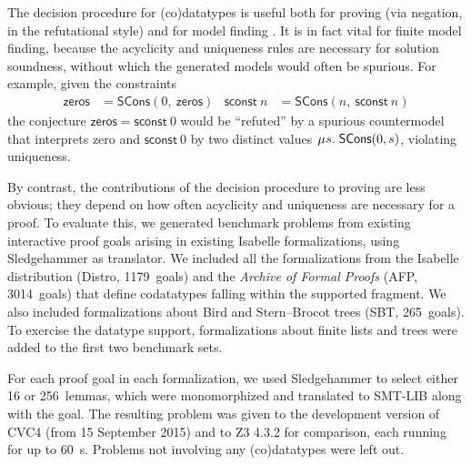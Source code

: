 \documentclass[letter]{article}
\newcommand\MU{\vvthinspace\mu\vvthinspace}
\theoremstyle{definition}
\newcommand\const[1]{\textsf{#1}}
\newcommand\vvthinspace{\kern+0.041667em}
\begin{document}
\newcommand\gandl{SBT}
\newcommand\HD[1]{\hbox to2em{\relax\hfill\!\!\!\!#1\!\!\!\!\hfill}}

The decision procedure for (co)datatypes is useful both for proving (via
negation, in the refutational style) and for model finding
\cite{ge-de-moura-2009,reynolds-et-al-2013}.
It is in fact vital for finite model finding,
because the acyclicity and uniqueness rules are necessary for solution
soundness, without which the generated models would often be
spurious. For example, given the constraints
\begin{align*}
\const{zeros} & = \const{SCons}(0,\:\const{zeros})
& \const{sconst}~n & = \const{SCons}(n,\:\const{sconst}~n)
\end{align*}
the conjecture
$\const{zeros} = \const{sconst}~0$
would be ``refuted'' by a spurious countermodel that interprets
\const{zero} and $\const{sconst}~0$ by two distinct
values $\MU s.\; \const{SCons}(0, s)$,
violating uniqueness.

By contrast, the contributions of the decision procedure
to proving are less obvious; they depend on how
often acyclicity and uniqueness are necessary for a proof.
To evaluate this,
we generated benchmark problems from existing interactive
proof goals arising in existing
Isabelle formalizations, using Sledgehammer \cite{blanchette-et-al-2013-smt}
as translator.
We
included all the formalizations from the Isabelle distribution (Distro, 1179~goals)
and the \emph{Archive of Formal Proofs} (AFP, 3014~goals) that define codatatypes falling within the supported fragment. We
also included formalizations about Bird and Stern--Brocot trees (\gandl,
265~goals). %
To exercise the datatype support, formalizations about finite
lists and trees
were added to the first two benchmark sets.



For each proof goal in each formalization, we used Sledgehammer to select either 16 or
256~lemmas, which were monomorphized and translated to SMT-LIB along with the
goal. The resulting problem was given to the
development version of CVC4
(from 15 September 2015) and to
Z3 4.3.2 for comparison, each running for
up to 60~s. %
Problems not involving any (co)datatypes were left out.
\end{document}
